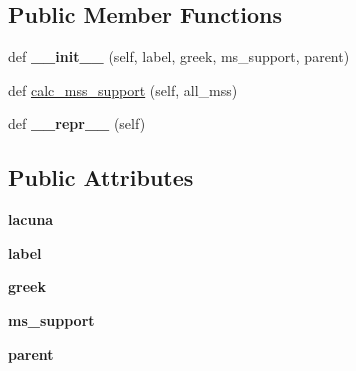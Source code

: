 \subsection*{Public Member Functions}
\begin{DoxyCompactItemize}
\item 
\mbox{\label{classCBGM_1_1lib_1_1populate__db_1_1Reading_a02aca2181c2899f2d4ed0fc4e3627f0a}} 
def {\bfseries \+\_\+\+\_\+init\+\_\+\+\_\+} (self, label, greek, ms\+\_\+support, parent)
\item 
def \hyperlink{classCBGM_1_1lib_1_1populate__db_1_1Reading_a296d86f9765cb12979a79917d1473f16}{calc\+\_\+mss\+\_\+support} (self, all\+\_\+mss)
\item 
\mbox{\label{classCBGM_1_1lib_1_1populate__db_1_1Reading_a58f54da63df31efee90483aa0f78f067}} 
def {\bfseries \+\_\+\+\_\+repr\+\_\+\+\_\+} (self)
\end{DoxyCompactItemize}
\subsection*{Public Attributes}
\begin{DoxyCompactItemize}
\item 
\mbox{\label{classCBGM_1_1lib_1_1populate__db_1_1Reading_ad3bc40935ce92811093fc208cc12b27c}} 
{\bfseries lacuna}
\item 
\mbox{\label{classCBGM_1_1lib_1_1populate__db_1_1Reading_a28d988136e579a32b2b762f4e3e6eb97}} 
{\bfseries label}
\item 
\mbox{\label{classCBGM_1_1lib_1_1populate__db_1_1Reading_ad0266c8b5e2e20629ead4a5b13959f16}} 
{\bfseries greek}
\item 
\mbox{\label{classCBGM_1_1lib_1_1populate__db_1_1Reading_a6875ac42d8bcc19dd3433543fbff1aae}} 
{\bfseries ms\+\_\+support}
\item 
\mbox{\label{classCBGM_1_1lib_1_1populate__db_1_1Reading_a0eb7d871d6ba55d9add6619e45c79190}} 
{\bfseries parent}
\end{DoxyCompactItemize}


